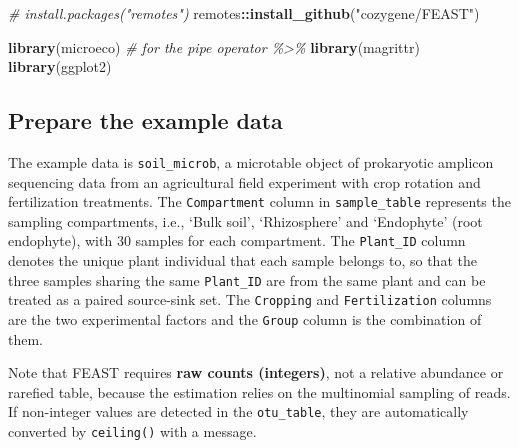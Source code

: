 \documentclass[
]{book}
\newenvironment{Shaded}{\begin{snugshade}}{\end{snugshade}}
\newcommand{\CommentTok}[1]{\textcolor[rgb]{0.56,0.35,0.01}{\textit{#1}}}
\newcommand{\FunctionTok}[1]{\textcolor[rgb]{0.13,0.29,0.53}{\textbf{#1}}}
\newcommand{\NormalTok}[1]{#1}
\newcommand{\SpecialCharTok}[1]{\textcolor[rgb]{0.81,0.36,0.00}{\textbf{#1}}}
\newcommand{\StringTok}[1]{\textcolor[rgb]{0.31,0.60,0.02}{#1}}
\begin{document}
\begin{Shaded}
\begin{Highlighting}[]
\CommentTok{\# install.packages("remotes")}
\NormalTok{remotes}\SpecialCharTok{::}\FunctionTok{install\_github}\NormalTok{(}\StringTok{"cozygene/FEAST"}\NormalTok{)}

\FunctionTok{library}\NormalTok{(microeco)}
\CommentTok{\# for the pipe operator \%\textgreater{}\%}
\FunctionTok{library}\NormalTok{(magrittr)}
\FunctionTok{library}\NormalTok{(ggplot2)}
\end{Highlighting}
\end{Shaded}

\subsection{Prepare the example data}\label{prepare-the-example-data-2}

The example data is \texttt{soil\_microb}, a microtable object of prokaryotic amplicon sequencing data
from an agricultural field experiment with crop rotation and fertilization treatments.
The \texttt{Compartment} column in \texttt{sample\_table} represents the sampling compartments,
i.e., `Bulk soil', `Rhizosphere' and `Endophyte' (root endophyte), with 30 samples for each compartment.
The \texttt{Plant\_ID} column denotes the unique plant individual that each sample belongs to,
so that the three samples sharing the same \texttt{Plant\_ID} are from the same plant
and can be treated as a paired source-sink set.
The \texttt{Cropping} and \texttt{Fertilization} columns are the two experimental factors and
the \texttt{Group} column is the combination of them.

Note that FEAST requires \textbf{raw counts (integers)}, not a relative abundance or rarefied table,
because the estimation relies on the multinomial sampling of reads.
If non-integer values are detected in the \texttt{otu\_table}, they are automatically converted by \texttt{ceiling()} with a message.

\begin{Shaded}
\end{Shaded}
\end{document}
